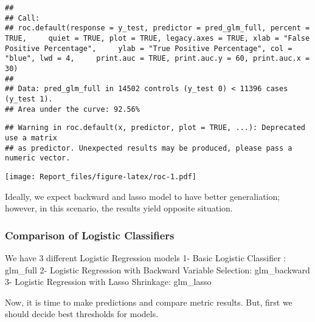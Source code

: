 \documentclass[
]{article}
\begin{document}
\begin{verbatim}
## 
## Call:
## roc.default(response = y_test, predictor = pred_glm_full, percent = TRUE,     quiet = TRUE, plot = TRUE, legacy.axes = TRUE, xlab = "False Positive Percentage",     ylab = "True Positive Percentage", col = "blue", lwd = 4,     print.auc = TRUE, print.auc.y = 60, print.auc.x = 30)
## 
## Data: pred_glm_full in 14502 controls (y_test 0) < 11396 cases (y_test 1).
## Area under the curve: 92.56%
\end{verbatim}

\begin{verbatim}
## Warning in roc.default(x, predictor, plot = TRUE, ...): Deprecated use a matrix
## as predictor. Unexpected results may be produced, please pass a numeric vector.
\end{verbatim}

\texttt{[image: Report\_files/figure-latex/roc-1.pdf]}

Ideally, we expect backward and lasso model to have better
generaliation; however, in this scenario, the results yield opposite
situation.

\hypertarget{comparison-of-logistic-classifiers}{%
\subsubsection{Comparison of Logistic
Classifiers}\label{comparison-of-logistic-classifiers}}

We have 3 different Logistic Regression models 1- Basic Logistic
Classifier : glm\_full 2- Logistic Regression with Backward Variable
Selection: glm\_backward 3- Logistic Regression with Lasso Shrinkage:
glm\_lasso

Now, it is time to make predictions and compare metric results. But,
first we should decide best thresholds for models.
\end{document}
